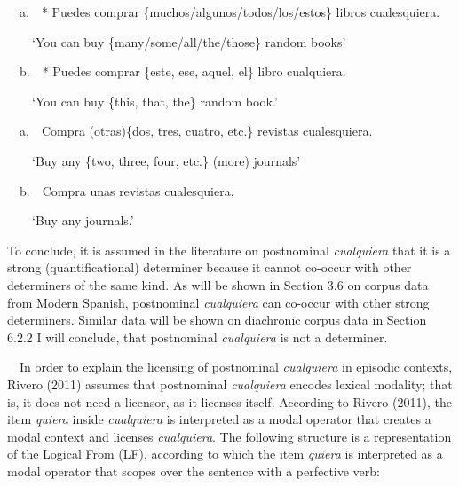 \begin{styleStandard}
\label{bkm:Ref63458156}\ \ a.\ \ * Puedes comprar \{muchos/algunos/todos/los/estos\} libros cualesquiera.
\end{styleStandard}

\begin{styleStandard}
\ \ \ \ ‘You can buy \{many/some/all/the/those\} random books’
\end{styleStandard}

\begin{styleStandard}
\ \ b.\ \ * Puedes comprar \{este, ese, aquel, el\} libro cualquiera.
\end{styleStandard}

\begin{styleStandard}
\ \ \ \ ‘You can buy \{this, that, the\} random book.’
\end{styleStandard}

\begin{styleStandard}
\label{bkm:Ref533762162}\ \ a.\ \ Compra (otras)\{dos, tres, cuatro, etc.\} revistas cualesquiera.
\end{styleStandard}

\begin{styleStandard}
\ \ \ \ ‘Buy any \{two, three, four, etc.\} (more) journals’
\end{styleStandard}

\begin{styleStandard}
\ \ b.\ \ Compra unas revistas cualesquiera.
\end{styleStandard}

\begin{styleStandard}
\ \ \ \ ‘Buy any journals.’
\end{styleStandard}

\begin{styleStandard}
To conclude, it is assumed in the literature on postnominal \textit{cualquiera} that it is a strong (quantificational) determiner because it cannot co-occur with other determiners of the same kind. As will be shown in Section 3.6 on corpus data from Modern Spanish, postnominal \textit{cualquiera} can co-occur with other strong determiners. Similar data will be shown on diachronic corpus data in Section 6.2.2 I will conclude, that postnominal \textit{cualquiera} is not a determiner. 
\end{styleStandard}

\begin{styleStandard}
\ \ In order to explain the licensing of postnominal \textit{cualquiera} in episodic contexts, Rivero (2011) assumes that postnominal \textit{cualquiera} encodes lexical modality; that is, it does not need a licensor, as it licenses itself. According to Rivero (2011), the item \textit{quiera} inside \textit{cualquiera} is interpreted as a modal operator that creates a modal context and licenses \textit{cualquiera}. The following structure is a representation of the Logical From (LF), according to which the item \textit{quiera} is interpreted as a modal operator that scopes over the sentence with a perfective verb:
\end{styleStandard}

